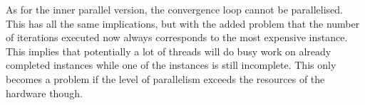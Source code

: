 \newpar
As for the inner parallel version, the convergence loop cannot be parallelised. This has all the same implications, but with the added problem that the number of iterations executed now always corresponds to the most expensive instance. This implies that potentially a lot of threads will do busy work on already completed instances while one of the instances is still incomplete. This only becomes a problem if the level of parallelism exceeds the resources of the hardware though.
